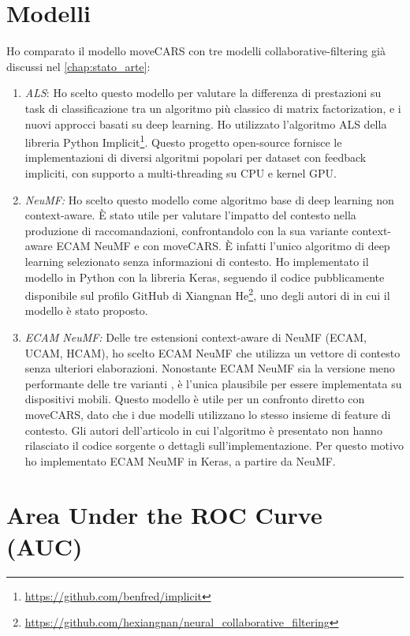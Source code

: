 \documentclass[12pt,italian]{report}
\begin{document}
\section{Modelli} \label{sec:comp-model}
Ho comparato il modello moveCARS con tre modelli collaborative-filtering già discussi nel \autoref{chap:stato_arte}:
\begin{enumerate}
\item \textit{ALS}: Ho scelto questo modello per valutare la differenza di prestazioni su task di classificazione tra un algoritmo più classico di matrix factorization,
e i nuovi approcci basati su deep learning. Ho utilizzato l'algoritmo ALS della libreria Python Implicit\footnote{\url{https://github.com/benfred/implicit}}. Questo progetto open-source fornisce le implementazioni di diversi algoritmi popolari per dataset con feedback impliciti, con supporto a multi-threading su CPU e kernel GPU. 

\item \textit{NeuMF:} Ho scelto questo modello come algoritmo base di deep learning non context-aware. \`E stato utile 
per valutare l'impatto del contesto nella produzione di raccomandazioni, confrontandolo con la sua variante context-aware ECAM NeuMF e con moveCARS. \`E infatti l'unico algoritmo di deep learning selezionato senza informazioni di contesto. Ho implementato il modello in Python con la libreria Keras, seguendo il codice pubblicamente disponibile sul profilo GitHub di Xiangnan He\footnote{\url{https://github.com/hexiangnan/neural_collaborative_filtering}}, uno degli autori di \cite{NCF} in cui il modello è stato proposto.

\item \textit{ECAM NeuMF:} Delle tre estensioni context-aware di NeuMF (ECAM, UCAM, HCAM), ho scelto ECAM NeuMF che utilizza un vettore di contesto senza ulteriori elaborazioni. Nonostante ECAM NeuMF sia la versione meno performante delle tre varianti \cite{context-aware-deep-learning}, è l'unica plausibile per essere implementata su dispositivi mobili. Questo modello è utile per un confronto diretto con moveCARS, dato che i due modelli utilizzano lo stesso insieme di feature di contesto. Gli autori dell'articolo in cui l'algoritmo è presentato non hanno rilasciato il codice sorgente o dettagli sull'implementazione. Per questo motivo ho implementato ECAM NeuMF in Keras, a partire da NeuMF.
\end{enumerate}

\section{Area Under the ROC Curve (AUC)} \label{sec:auc}
\end{document}
